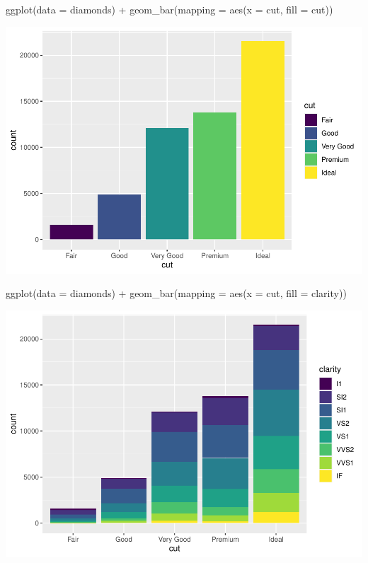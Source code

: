 \documentclass[
]{article}
\newenvironment{Shaded}{\begin{snugshade}}{\end{snugshade}}
\newcommand{\AttributeTok}[1]{\textcolor[rgb]{0.77,0.63,0.00}{#1}}
\newcommand{\FunctionTok}[1]{\textcolor[rgb]{0.00,0.00,0.00}{#1}}
\newcommand{\NormalTok}[1]{#1}
\newcommand{\SpecialCharTok}[1]{\textcolor[rgb]{0.00,0.00,0.00}{#1}}
\begin{document}
\begin{Shaded}
\begin{Highlighting}[]
\FunctionTok{ggplot}\NormalTok{(}\AttributeTok{data =}\NormalTok{ diamonds) }\SpecialCharTok{+} 
  \FunctionTok{geom\_bar}\NormalTok{(}\AttributeTok{mapping =} \FunctionTok{aes}\NormalTok{(}\AttributeTok{x =}\NormalTok{ cut, }\AttributeTok{fill =}\NormalTok{ cut))}
\end{Highlighting}
\end{Shaded}

\includegraphics{Journal_files/figure-latex/unnamed-chunk-48-2.pdf}

\begin{Shaded}
\begin{Highlighting}[]
\FunctionTok{ggplot}\NormalTok{(}\AttributeTok{data =}\NormalTok{ diamonds) }\SpecialCharTok{+} 
  \FunctionTok{geom\_bar}\NormalTok{(}\AttributeTok{mapping =} \FunctionTok{aes}\NormalTok{(}\AttributeTok{x =}\NormalTok{ cut, }\AttributeTok{fill =}\NormalTok{ clarity))}
\end{Highlighting}
\end{Shaded}

\includegraphics{Journal_files/figure-latex/unnamed-chunk-48-3.pdf}
\end{document}
